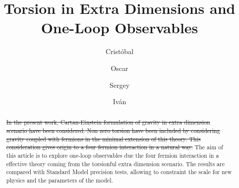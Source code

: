 \documentclass[twocolumn,showpacs,showkeys,prd,superscriptaddress]{revtex4-1}
\newcommand\out[1]{{\color{red}\sout{#1}}}
\begin{document}
\title{Torsion in Extra Dimensions and One-Loop Observables}

\author{Crist\'obal }

\author{Oscar }

\author{Sergey }

\author{Iv\'an }

\begin{abstract}
  \out{In the present work, Cartan-Einstein formulation of gravity in extra dimension scenario have been considered. Non zero torsion have been included by considering gravity coupled with fermions in the minimal extension of this theory. This consideration gives origin to a four fermion interaction in a natural way.}
  The aim of this article is to explore one-loop observables due the four fermion interaction in a effective theory coming from the torsionful extra dimension scenario. The results are compared with Standard Model precision tests, allowing  to constraint the scale for new physics and the parameters of the model.
\end{abstract}

\maketitle










\appendix





\end{document}
